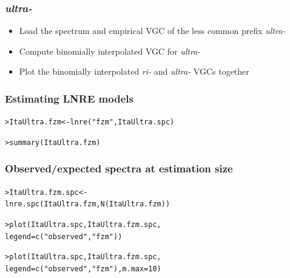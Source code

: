\documentclass[t]{beamer} %
\begin{document}
\begin{frame}
  \frametitle{\emph{ultra-}}

  \begin{itemize}
  \item Load the spectrum and empirical VGC of the less common prefix \emph{ultra-}
  \item Compute binomially interpolated VGC for \emph{ultra-}
  \item Plot the binomially interpolated \emph{ri-} and \emph{ultra-}
    VGCs together
  \end{itemize}

\end{frame}


\begin{frame}[fragile]
  \frametitle{Estimating LNRE models}

\begin{alltt}

> ItaUltra.fzm <- lnre("fzm", ItaUltra.spc)

> summary(ItaUltra.fzm)
\end{alltt}

\end{frame}


\begin{frame}[fragile]
  \frametitle{Observed/expected spectra at estimation size}
\begin{alltt}
> ItaUltra.fzm.spc <- 
  lnre.spc(ItaUltra.fzm, N(ItaUltra.fzm))

> plot(ItaUltra.spc, ItaUltra.fzm.spc,
       legend=c("observed", "fzm"))

> plot(ItaUltra.spc, ItaUltra.fzm.spc, 
       legend=c("observed", "fzm"), m.max=10)
\end{alltt}
\end{frame}





\end{document}

